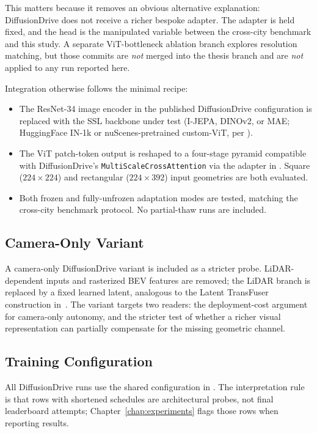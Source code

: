 This matters because it removes an obvious alternative explanation: DiffusionDrive does not receive a richer bespoke adapter. The adapter is held fixed, and the head is the manipulated variable between the cross-city benchmark and this study. A separate ViT-bottleneck ablation branch explores resolution matching, but those commits are \emph{not} merged into the thesis branch and are \emph{not} applied to any run reported here.

Integration otherwise follows the minimal recipe:
\begin{itemize}
    \item The ResNet-34 image encoder in the published DiffusionDrive configuration is replaced with the SSL backbone under test (I-JEPA, DINOv2, or MAE; HuggingFace IN-1k or nuScenes-pretrained custom-ViT, per ).
    \item The ViT patch-token output is reshaped to a four-stage pyramid compatible with DiffusionDrive's \texttt{MultiScaleCrossAttention} via the adapter in . Square (\(224{\times}224\)) and rectangular (\(224{\times}392\)) input geometries are both evaluated.
    \item Both frozen and fully-unfrozen adaptation modes are tested, matching the cross-city benchmark protocol. No partial-thaw runs are included.
\end{itemize}

\subsection{Camera-Only Variant}
\label{sec:meth-dd-camera-only}

A camera-only DiffusionDrive variant is included as a stricter probe. LiDAR-dependent inputs and rasterized BEV features are removed; the LiDAR branch is replaced by a fixed learned latent, analogous to the Latent TransFuser construction in~. The variant targets two readers: the deployment-cost argument for camera-only autonomy, and the stricter test of whether a richer visual representation can partially compensate for the missing geometric channel.

\subsection{Training Configuration}
\label{sec:meth-dd-training}

All DiffusionDrive runs use the shared configuration in . The interpretation rule is that rows with shortened schedules are architectural probes, not final leaderboard attempts; Chapter~\ref{chap:experiments} flags those rows when reporting results.

